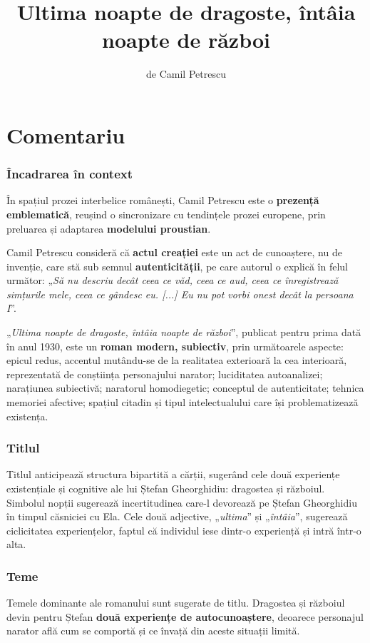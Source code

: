 \documentclass{article}
\title{Ultima noapte de dragoste, întâia noapte de război}
\author{de Camil Petrescu}
\date{}
\newcommand{\qu}[1]{„\emph{#1}”}
\begin{document}
\maketitle

\part*{Comentariu}
\section{Încadrarea în context}
În spațiul prozei interbelice românești, Camil Petrescu este o \textbf{prezență emblematică}, reușind o sincronizare cu tendințele prozei europene, prin preluarea și adaptarea \textbf{modelului proustian}.

Camil Petrescu consideră că \textbf{actul creației} este un act de cunoaștere, nu de invenție, care stă sub semnul \textbf{autenticității}, pe care autorul o explică în felul următor: \qu{Să nu descriu decât ceea ce văd, ceea ce aud, ceea ce înregistrează simțurile mele, ceea ce gândesc eu. [...] Eu nu pot vorbi onest decât la persoana I}.

\qu{Ultima noapte de dragoste, întâia noapte de război}, publicat pentru prima dată în anul 1930, este un \textbf{roman modern, subiectiv}, prin următoarele aspecte: epicul redus, accentul mutându-se de la realitatea exterioară la cea interioară, reprezentată de conștiința personajului narator; luciditatea autoanalizei; narațiunea subiectivă; naratorul homodiegetic; conceptul de autenticitate; tehnica memoriei afective; spațiul citadin și tipul intelectualului care își problematizează existența.
\section{Titlul}
Titlul anticipează structura bipartită a cărții, sugerând cele două experiențe existențiale și cognitive ale lui Ștefan Gheorghidiu: dragostea și războiul. Simbolul nopții sugerează incertitudinea care-l devorează pe Ștefan Gheorghidiu în timpul căsniciei cu Ela. Cele două adjective, \qu{ultima} și \qu{întâia}, sugerează ciclicitatea experiențelor, faptul că individul iese dintr-o experiență și intră într-o alta.
\section{Teme}
Temele dominante ale romanului sunt sugerate de titlu. Dragostea și războiul devin pentru Ștefan \textbf{două experiențe de autocunoaștere}, deoarece personajul narator află cum se comportă și ce învață din aceste situații limită.
\end{document}
